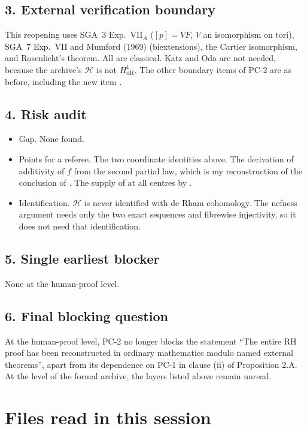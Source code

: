 \documentclass[11pt]{article}
\theoremstyle{remark}
\begin{document}
\subsection*{3. External verification boundary}

This reopening uses SGA~3 Exp.~VII$_A$ ($[p]=VF$, $V$ an isomorphism on tori), SGA~7 Exp.~VII and Mumford (1969) (biextensions), the Cartier isomorphism, and Rosenlicht's theorem. All are classical. Katz and Oda are not needed, because the archive's $\mathcal H$ is not $H^1_{\mathrm{dR}}$. The other boundary items of PC-2 are as before, including the new item .

\subsection*{4. Risk audit}
\begin{itemize}[nosep]
\item Gap. None found.
\item Points for a referee. The two coordinate identities above. The derivation of additivity of $f$ from the second partial law, which is my reconstruction of the conclusion of . The supply of  at all centres by .
\item Identification. $\mathcal H$ is never identified with de Rham cohomology. The nefness argument needs only the two exact sequences and fibrewise injectivity, so it does not need that identification.
\end{itemize}

\subsection*{5. Single earliest blocker}

None at the human-proof level.

\subsection*{6. Final blocking question}

At the human-proof level, PC-2 no longer blocks the statement ``The entire RH proof has been reconstructed in ordinary mathematics modulo named external theorems'', apart from its dependence on PC-1 in clause (ii) of Proposition 2.A. At the level of the formal archive, the layers listed above remain unread.

\section*{Files read in this session}
\end{document}
